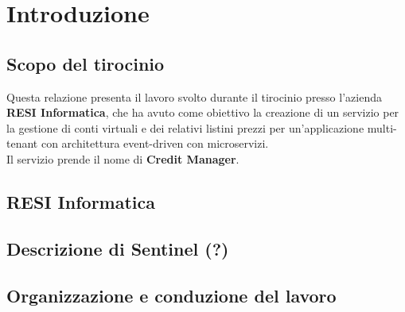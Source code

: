 \chapter{Introduzione}

\section{Scopo del tirocinio}
Questa relazione presenta il lavoro svolto durante il tirocinio presso l'azienda \textbf{RESI Informatica}, che ha avuto come obiettivo la creazione di un servizio per la
gestione di conti virtuali e dei relativi listini prezzi per un'applicazione multi-tenant con architettura event-driven con microservizi.
\\
Il servizio prende il nome di \textbf{Credit Manager}.

\section{RESI Informatica}

\section{Descrizione di Sentinel (?)}


\section{Organizzazione e conduzione del lavoro}

